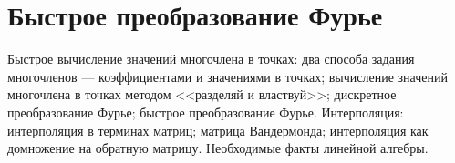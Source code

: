 \section{Быстрое преобразование Фурье}
Быстрое вычисление значений многочлена в точках:
два способа задания многочленов
--- коэффициентами и значениями в точках;
вычисление значений многочлена в точках методом
<<разделяй и властвуй>>;
дискретное преобразование Фурье;
быстрое преобразование Фурье.
Интерполяция: интерполяция в терминах матриц;
матрица Вандермонда;
интерполяция как домножение на обратную матрицу.
Необходимые факты линейной алгебры.
